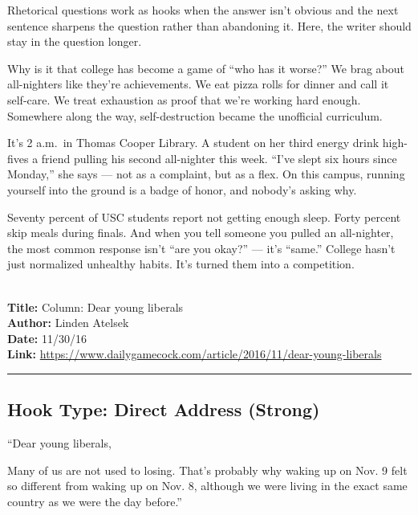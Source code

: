 \documentclass[12pt]{article}
\newcounter{examplenum}
\newcommand{\totalexamples}{10}
\newcommand{\exampleheader}[4]{%
    \newpage
    \stepcounter{examplenum}%
    \noindent{\large\bfseries\color{garnet} Example \theexamplenum\ of \totalexamples}\\[6pt]
    \textbf{Title:} #1\\
    \textbf{Author:} #2\\
    \textbf{Date:} #3\\
    \textbf{Link:} \url{#4}\\[4pt]
    \noindent\rule{\textwidth}{0.4pt}
    \vspace{6pt}
}
\begin{document}
Rhetorical questions work as hooks when the answer isn't obvious and the next sentence sharpens the question rather than abandoning it. Here, the writer should stay in the question longer.

\begin{seasonbox}
Why is it that college has become a game of ``who has it worse?'' We brag about all-nighters like they're achievements. We eat pizza rolls for dinner and call it self-care. We treat exhaustion as proof that we're working hard enough. Somewhere along the way, self-destruction became the unofficial curriculum.
\end{seasonbox}

\begin{seasonbox}
It's 2 a.m.\ in Thomas Cooper Library. A student on her third energy drink high-fives a friend pulling his second all-nighter this week. ``I've slept six hours since Monday,'' she says --- not as a complaint, but as a flex. On this campus, running yourself into the ground is a badge of honor, and nobody's asking why.
\end{seasonbox}

\begin{seasonbox}
Seventy percent of USC students report not getting enough sleep. Forty percent skip meals during finals. And when you tell someone you pulled an all-nighter, the most common response isn't ``are you okay?'' --- it's ``same.'' College hasn't just normalized unhealthy habits. It's turned them into a competition.
\end{seasonbox}

\exampleheader
{Column: Dear young liberals}
{Linden Atelsek}
{11/30/16}
{https://www.dailygamecock.com/article/2016/11/dear-young-liberals}

\subsection*{Hook Type: Direct Address (Strong)}

\begin{promptbox}
``Dear young liberals,

Many of us are not used to losing. That's probably why waking up on Nov. 9 felt so different from waking up on Nov. 8, although we were living in the exact same country as we were the day before.''
\end{promptbox}
\end{document}
